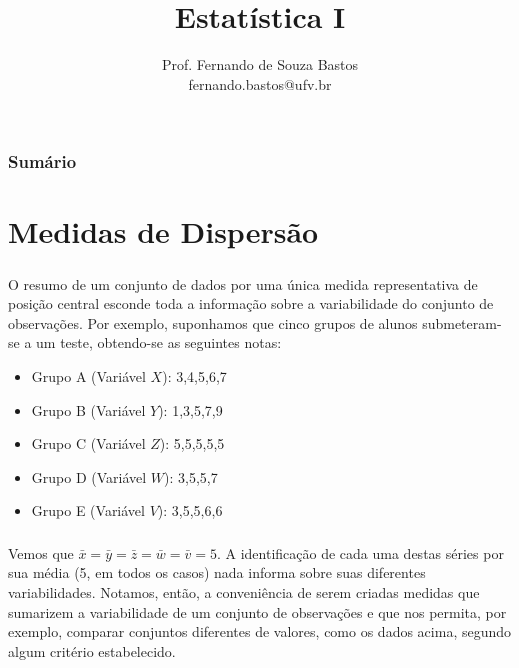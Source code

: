 \documentclass[14pt,aspectratio=1610]{beamer}
\title{Estatística I}
\author{Prof. Fernando de Souza Bastos \texorpdfstring{\\ fernando.bastos@ufv.br}{}}
\institute{Departamento de Estatística \texorpdfstring{\\ Universidade Federal de Viçosa}{}\texorpdfstring{\\ Campus UFV - Viçosa}{}}
\date{}
\begin{document}
%

\frame{\titlepage}

\begin{frame}{}
\frametitle{\bf Sumário}
\tableofcontents
\end{frame}

\section{Medidas de Dispersão}
\begin{frame}{}
\frametitle{}
\begin{block}{}
\justifying
O resumo de um conjunto de dados por uma única medida representativa de posição
central esconde toda a informação sobre a variabilidade do conjunto de observações.
Por exemplo, suponhamos que cinco grupos de alunos submeteram-se a um
teste, obtendo-se as seguintes notas:
\begin{itemize}
\item Grupo A (Variável $X$): 3,4,5,6,7
\item Grupo B (Variável $Y$): 1,3,5,7,9
\item Grupo C (Variável $Z$): 5,5,5,5,5
\item Grupo D (Variável $W$): 3,5,5,7
\item Grupo E (Variável $V$): 3,5,5,6,6
\end{itemize}
\end{block}
\end{frame}

\begin{frame}{}
\frametitle{}
\begin{block}{}
\justifying
Vemos que $\bar{x}=\bar{y}=\bar{z}=\bar{w}=\bar{v}=5$. A identificação de cada uma destas séries por sua
média (5, em todos os casos) nada informa sobre suas diferentes variabilidades. Notamos, então, a conveniência de serem criadas medidas que sumarizem a variabilidade de um conjunto de observações e que nos permita, por exemplo, comparar conjuntos diferentes de valores, como os dados acima, segundo algum critério estabelecido.
\end{block}
\end{frame}

\end{document}
